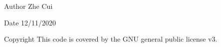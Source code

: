 \begin{DoxyAuthor}{Author}
Zhe Cui 
\end{DoxyAuthor}
\begin{DoxyDate}{Date}
12/11/2020 
\end{DoxyDate}
\begin{DoxyCopyright}{Copyright}
This code is covered by the G\+NU general public license v3. 
\end{DoxyCopyright}
